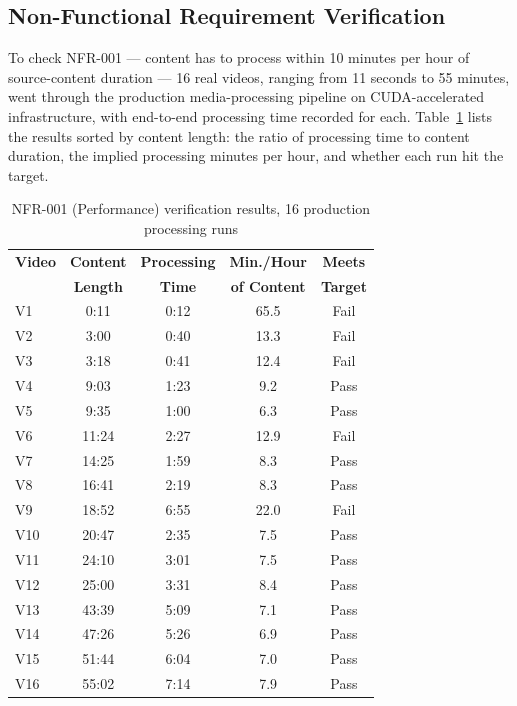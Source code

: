 \subsection{Non-Functional Requirement Verification}\label{sec:nfr_verification}To check NFR-001 --- content has to process within 10 minutes per hour of source-content duration --- 16 real videos, ranging from 11 seconds to 55 minutes, went through the production media-processing pipeline on CUDA-accelerated infrastructure, with end-to-end processing time recorded for each. Table~\ref{tab:nfr_performance} lists the results sorted by content length: the ratio of processing time to content duration, the implied processing minutes per hour, and whether each run hit the target. \begin{table}[H]
    \centering
    \footnotesize
    \caption{NFR-001 (Performance) verification results, 16 production processing runs}\label{tab:nfr_performance}
    \begin{tabular}{lcccc}
        \toprule
        \textbf{Video} & \textbf{Content} & \textbf{Processing} & \textbf{Min./Hour} & \textbf{Meets} \\
        & \textbf{Length} & \textbf{Time} & \textbf{of Content} & \textbf{Target} \\
        \midrule
        V1  & 0:11  & 0:12 & 65.5 & Fail \\
        V2  & 3:00  & 0:40 & 13.3 & Fail \\
        V3  & 3:18  & 0:41 & 12.4 & Fail \\
        V4  & 9:03  & 1:23 & 9.2  & Pass \\
        V5  & 9:35  & 1:00 & 6.3  & Pass \\
        V6  & 11:24 & 2:27 & 12.9 & Fail \\
        V7  & 14:25 & 1:59 & 8.3  & Pass \\
        V8  & 16:41 & 2:19 & 8.3  & Pass \\
        V9  & 18:52 & 6:55 & 22.0 & Fail \\
        V10 & 20:47 & 2:35 & 7.5  & Pass \\
        V11 & 24:10 & 3:01 & 7.5  & Pass \\
        V12 & 25:00 & 3:31 & 8.4  & Pass \\
        V13 & 43:39 & 5:09 & 7.1  & Pass \\
        V14 & 47:26 & 5:26 & 6.9  & Pass \\
        V15 & 51:44 & 6:04 & 7.0  & Pass \\
        V16 & 55:02 & 7:14 & 7.9  & Pass \\

\end{tabular}
\end{table}
